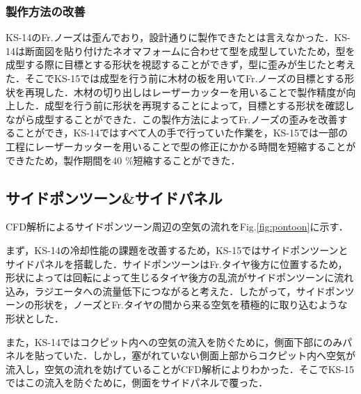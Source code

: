 \subsubsection{製作方法の改善}
KS-14のFr.ノーズは歪んでおり，設計通りに製作できたとは言えなかった．KS-14は断面図を貼り付けたネオマフォームに合わせて型を成型していたため，型を成型する際に目標とする形状を視認することができず，型に歪みが生じたと考えた．そこでKS-15では成型を行う前に木材の板を用いてFr.ノーズの目標とする形状を再現した．木材の切り出しはレーザーカッターを用いることで製作精度が向上した．成型を行う前に形状を再現することによって，目標とする形状を確認しながら成型することができた．この製作方法によってFr.ノーズの歪みを改善することができ，KS-14ではすべて人の手で行っていた作業を，KS-15では一部の工程にレーザーカッターを用いることで型の修正にかかる時間を短縮することができたため，製作期間を40 \%短縮することができた．

\subsection{サイドポンツーン\&サイドパネル}
CFD解析によるサイドポンツーン周辺の空気の流れをFig.\ref{fig:pontoon}に示す．

まず，KS-14の冷却性能の課題を改善するため，KS-15ではサイドポンツーンとサイドパネルを搭載した．サイドポンツーンはFr.タイヤ後方に位置するため，形状によっては回転によって生じるタイヤ後方の乱流がサイドポンツーンに流れ込み，ラジエータへの流量低下につながると考えた．したがって，サイドポンツーンの形状を，ノーズとFr.タイヤの間から来る空気を積極的に取り込むような形状とした．

また，KS-14ではコクピット内への空気の流入を防ぐために，側面下部にのみパネルを貼っていた．しかし，塞がれていない側面上部からコクピット内へ空気が流入し，空気の流れを妨げていることがCFD解析によりわかった．そこでKS-15ではこの流入を防ぐために，側面をサイドパネルで覆った．


